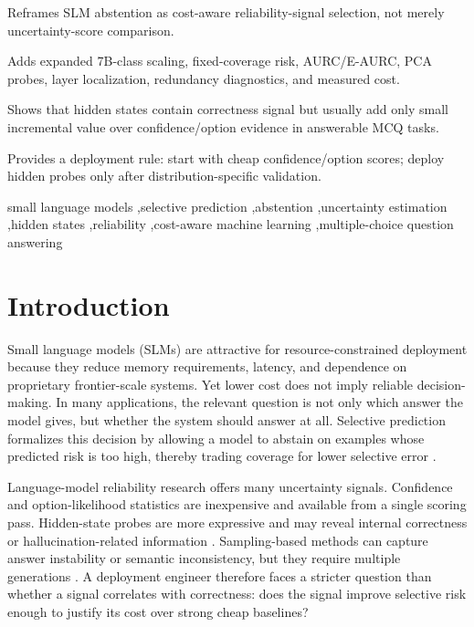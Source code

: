 \documentclass[preprint,12pt,authoryear]{elsarticle}
\begin{document}
\begin{frontmatter}
\begin{abstract}
demonstrates stable risk--coverage gains that justify white-box access and engineering complexity.
\end{abstract}

\begin{highlights}
\item Reframes SLM abstention as cost-aware reliability-signal selection, not merely uncertainty-score comparison.
\item Adds expanded 7B-class scaling, fixed-coverage risk, AURC/E-AURC, PCA probes, layer localization, redundancy diagnostics, and measured cost.
\item Shows that hidden states contain correctness signal but usually add only small incremental value over confidence/option evidence in answerable MCQ tasks.
\item Provides a deployment rule: start with cheap confidence/option scores; deploy hidden probes only after distribution-specific validation.
\end{highlights}

\begin{keyword}
small language models \sep selective prediction \sep abstention \sep uncertainty estimation \sep hidden states \sep reliability \sep cost-aware machine learning \sep multiple-choice question answering
\end{keyword}

\end{frontmatter}

\section{Introduction}
Small language models (SLMs) are attractive for resource-constrained deployment because they reduce memory requirements, latency, and dependence on proprietary frontier-scale systems. Yet lower cost does not imply reliable decision-making. In many applications, the relevant question is not only which answer the model gives, but whether the system should answer at all. Selective prediction formalizes this decision by allowing a model to abstain on examples whose predicted risk is too high, thereby trading coverage for lower selective error \citep{geifman2017selective,geifman2019selectivenet}.

Language-model reliability research offers many uncertainty signals. Confidence and option-likelihood statistics are inexpensive and available from a single scoring pass. Hidden-state probes are more expressive and may reveal internal correctness or hallucination-related information \citep{chen2024inside,orgad2024llms}. Sampling-based methods can capture answer instability or semantic inconsistency, but they require multiple generations \citep{manakul2023selfcheckgpt,farquhar2024semanticentropy}. A deployment engineer therefore faces a stricter question than whether a signal correlates with correctness: does the signal improve selective risk enough to justify its cost over strong cheap baselines?
\end{document}
